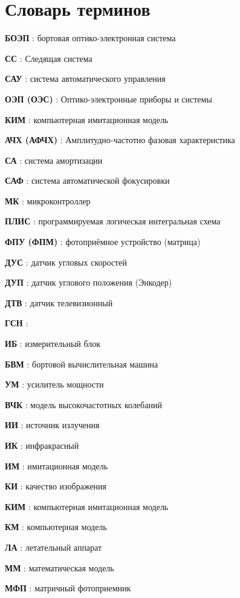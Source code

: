 \chapter*{Словарь терминов}             %

\textbf{БОЭП} : бортовая оптико-электронная система

\textbf{СС} : Следящая система 

\textbf{САУ} : система автоматического управления

\textbf{ОЭП (ОЭС)} : Оптико-электронные приборы и системы

\textbf{КИМ} : компьютерная имитационная модель 

\textbf{АЧХ (АФЧХ)} : Амплитудно-частотно фазовая характеристика

\textbf{СА} : система амортизации

\textbf{САФ} : система автоматической фокусировки

\textbf{МК} : микроконтроллер

\textbf{ПЛИС} : программируемая логическая интегральная схема

\textbf{ФПУ (ФПМ)} : фотоприёмное устройство (матрица)

\textbf{ДУС} : датчик угловых скоростей

\textbf{ДУП} : датчик углового положения (Энкодер)

\textbf{ДТВ} : датчик телевизионный

\textbf{ГСН} : 

\textbf{ИБ} : измерительный блок

\textbf{БВМ} : бортовой вычислительная машина

\textbf{УМ} : усилитель мощности

\textbf{ВЧК} : модель высокочастотных колебаний

\textbf{ИИ} : источник излучения

\textbf{ИК} : инфракрасный

\textbf{ИМ} : имитационная модель

\textbf{КИ} : качество изображения

\textbf{КИМ} : компьютерная имитационная модель

\textbf{КМ} : компьютерная модель

\textbf{ЛА} : летательный аппарат

\textbf{ММ} : математическая модель

\textbf{МФП} : матричный фотоприемник

